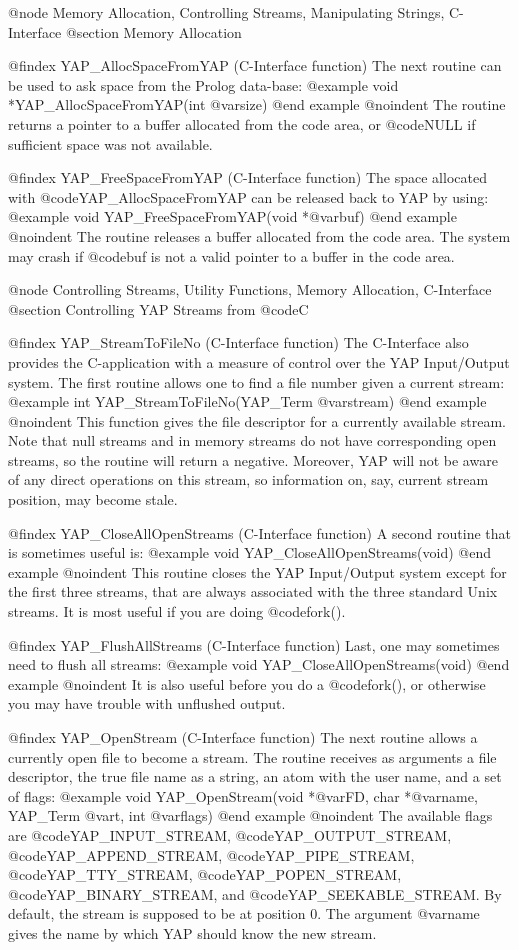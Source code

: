 {{{{{{{{@node Memory Allocation, Controlling Streams, Manipulating Strings, C-Interface
@section Memory Allocation

@findex YAP_AllocSpaceFromYAP (C-Interface function)
The next routine can be used to ask space from the Prolog data-base:
@example
      void      *YAP_AllocSpaceFromYAP(int @var{size})
@end example
@noindent
The routine returns a pointer to a buffer allocated from the code area,
or @code{NULL} if sufficient space was not available.

@findex YAP_FreeSpaceFromYAP (C-Interface function)
The space allocated with @code{YAP_AllocSpaceFromYAP} can be released
back to YAP by using:
@example
      void      YAP_FreeSpaceFromYAP(void *@var{buf})
@end example
@noindent
The routine releases a buffer allocated from the code area. The system
may crash if @code{buf} is not a valid pointer to a buffer in the code
area.

@node Controlling Streams, Utility Functions, Memory Allocation, C-Interface
@section Controlling YAP Streams from @code{C}

@findex YAP_StreamToFileNo (C-Interface function)
The C-Interface also provides the C-application with a measure of
control over the YAP Input/Output system. The first routine allows one
to find a file number given a current stream:
@example
      int      YAP_StreamToFileNo(YAP_Term @var{stream})
@end example
@noindent
This function gives the file descriptor for a currently available
stream. Note that null streams and in memory streams do not have
corresponding open streams, so the routine will return a
negative. Moreover, YAP will not be aware of any direct operations on
this stream, so information on, say, current stream position, may become
stale.

@findex YAP_CloseAllOpenStreams (C-Interface function)
A second routine that is sometimes useful is:
@example
      void      YAP_CloseAllOpenStreams(void)
@end example
@noindent
This routine closes the YAP Input/Output system except for the first
three streams, that are always associated with the three standard Unix
streams. It is most useful if you are doing @code{fork()}.

@findex YAP_FlushAllStreams (C-Interface function)
Last, one may sometimes need to flush all streams:
@example
      void      YAP_CloseAllOpenStreams(void)
@end example
@noindent
It is also useful before you do a @code{fork()}, or otherwise you may
have trouble with unflushed output.

@findex YAP_OpenStream (C-Interface function)
The next routine allows a currently open file to become a stream. The
routine receives as arguments a file descriptor, the true file name as a
string, an atom with the user name, and a set of flags:
@example
      void      YAP_OpenStream(void *@var{FD}, char *@var{name}, YAP_Term @var{t}, int @var{flags})
@end example
@noindent
The available flags are @code{YAP_INPUT_STREAM},
@code{YAP_OUTPUT_STREAM}, @code{YAP_APPEND_STREAM},
@code{YAP_PIPE_STREAM}, @code{YAP_TTY_STREAM}, @code{YAP_POPEN_STREAM},
@code{YAP_BINARY_STREAM}, and @code{YAP_SEEKABLE_STREAM}. By default, the
stream is supposed to be at position 0. The argument @var{name} gives
the name by which YAP should know the new stream.

}}}}}}}}
